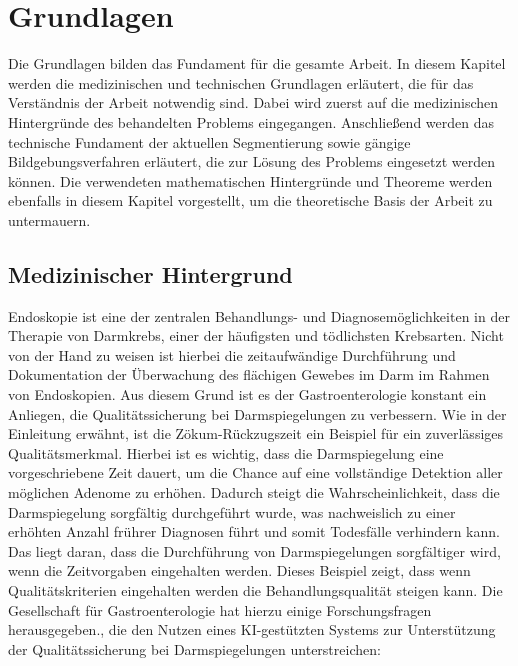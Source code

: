 \chapter{Grundlagen}\label{ch:preliminaries}

Die Grundlagen bilden das Fundament für die gesamte Arbeit.
In diesem Kapitel werden die medizinischen und technischen Grundlagen erläutert, die für das Verständnis der Arbeit notwendig sind.
Dabei wird zuerst auf die medizinischen Hintergründe des behandelten Problems eingegangen.
Anschließend werden das technische Fundament der aktuellen Segmentierung sowie gängige Bildgebungsverfahren erläutert, die zur Lösung des Problems eingesetzt werden können.
Die verwendeten mathematischen Hintergründe und Theoreme werden ebenfalls in diesem Kapitel vorgestellt, um die theoretische Basis der Arbeit zu untermauern.

\section{Medizinischer Hintergrund}
Endoskopie ist eine der zentralen Behandlungs- und Diagnosemöglichkeiten in der Therapie von Darmkrebs, 
einer der häufigsten und tödlichsten Krebsarten.\citep{labianca2010-colon-cancer}\footnotemark{} 
Nicht von der Hand zu weisen ist hierbei die zeitaufwändige Durchführung und 
Dokumentation der Überwachung des flächigen Gewebes im Darm im Rahmen von Endoskopien. Aus diesem Grund ist es 
der Gastroenterologie konstant ein Anliegen, die Qualitätssicherung bei Darmspiegelungen zu verbessern. 
Wie in der Einleitung erwähnt, ist die Zökum-Rückzugszeit ein Beispiel für ein zuverlässiges Qualitätsmerkmal.  Hierbei ist es wichtig, dass die Darmspiegelung eine vorgeschriebene Zeit dauert, um die Chance auf eine vollständige Detektion aller möglichen Adenome zu erhöhen. 
Dadurch steigt die Wahrscheinlichkeit, dass die Darmspiegelung sorgfältig durchgeführt wurde, was nachweislich zu einer 
erhöhten Anzahl frührer Diagnosen führt und somit Todesfälle verhindern kann. Das liegt daran, dass die Durchführung von Darmspiegelungen sorgfältiger wird, wenn 
die Zeitvorgaben eingehalten werden.
Dieses Beispiel zeigt, dass wenn Qualitätskriterien eingehalten werden die Behandlungsqualität steigen kann. 
Die Gesellschaft für Gastroenterologie hat hierzu einige Forschungsfragen herausgegeben.\citep{kaminski_performance_2017}, die den Nutzen eines KI-gestützten Systems zur Unterstützung der Qualitätssicherung bei Darmspiegelungen unterstreichen:


